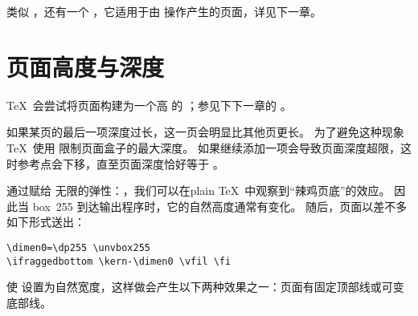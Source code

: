 \documentclass{book}
\begin{document}
类似 ，还有一个 ，它适用于由  操作产生的页面，详见下一章。

\section{页面高度与深度}


\TeX\ 会尝试将页面构建为一个高 的  ；参见下下一章的 。

如果某页的最后一项深度过长，这一页会明显比其他页更长。
为了避免这种现象 \TeX\ 使用  限制页面盒子的最大深度。
如果继续添加一项会导致页面深度超限，这时参考点会下移，直至页面深度恰好等于 。

通过赋给  无限的弹性：\hbox{}，我们可以在plain \TeX\ 中观察到“辣鸡页底”的效应。
因此当 box~255 到达输出程序时，它的自然高度通常有变化。
随后，页面以差不多如下形式送出：
\begin{verbatim}
\dimen0=\dp255 \unvbox255
\ifraggedbottom \kern-\dimen0 \vfil \fi 
\end{verbatim}
 使  设置为自然宽度，这样做会产生以下两种效果之一：页面有固定顶部线或可变底部线。
\end{document}
